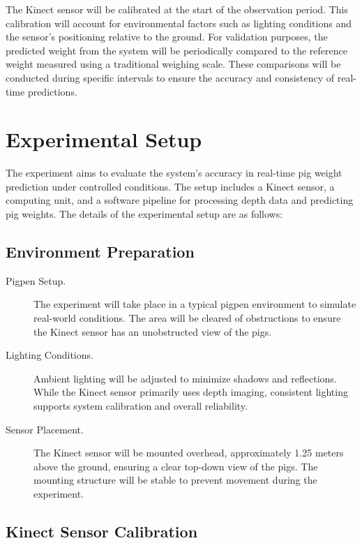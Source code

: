{The Kinect sensor will be calibrated at the start of the observation period. This calibration will account for environmental factors such as lighting conditions and the sensor's positioning relative to the ground. For validation purposes, the predicted weight from the system will be periodically compared to the reference weight measured using a traditional weighing scale. These comparisons will be conducted during specific intervals to ensure the accuracy and consistency of real-time predictions.

\section{Experimental Setup}

The experiment aims to evaluate the system's accuracy in real-time pig weight prediction under controlled conditions. The setup includes a Kinect sensor, a computing unit, and a software pipeline for processing depth data and predicting pig weights. The details of the experimental setup are as follows:

\subsection{Environment Preparation}

\begin{description}
	
	\item[Pigpen Setup.]
	The experiment will take place in a typical pigpen environment to simulate real-world conditions. The area will be cleared of obstructions to ensure the Kinect sensor has an unobstructed view of the pigs.
	
	\item[Lighting Conditions.]
	Ambient lighting will be adjusted to minimize shadows and reflections. While the Kinect sensor primarily uses depth imaging, consistent lighting supports system calibration and overall reliability.
	
	\item[Sensor Placement.]
	The Kinect sensor will be mounted overhead, approximately 1.25 meters above the ground, ensuring a clear top-down view of the pigs. The mounting structure will be stable to prevent movement during the experiment.
	
\end{description}

\subsection{Kinect Sensor Calibration}

}

